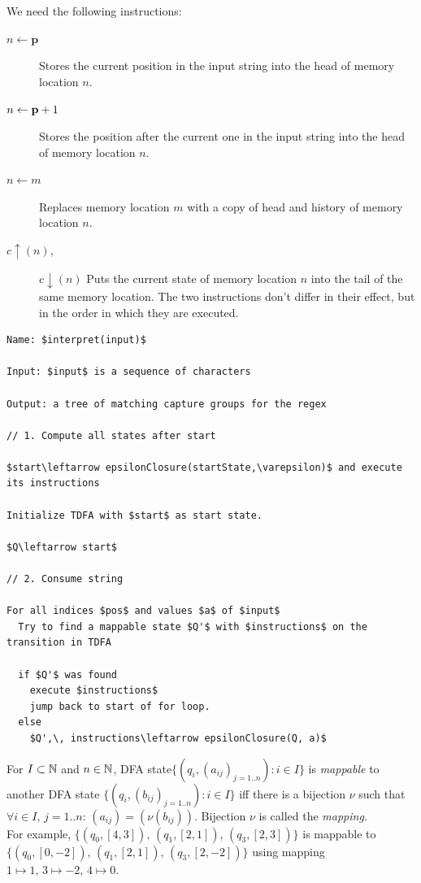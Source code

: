 \documentclass[english]{sigplanconf}
\begin{document}
We need the following instructions:
\begin{description}
\item [{$n\leftarrow\mathbf{p}$}] Stores the current position in the input
string into the head of memory location $n$.
\item [{$n\leftarrow\mathbf{\mathbf{p}}+1$}] Stores the position after the current one
in the input string into the head of memory location $n$.
\item [{$n\leftarrow m$}] Replaces memory location $m$ with a copy of
head and history of memory location $n$.
\item [{$c\uparrow(n)$,}] $c\downarrow(n)$ Puts the current state of
memory location $n$ into the tail of the same memory location. The
two instructions don't differ in their effect, but in the order in
which they are executed.
\end{description}
\begin{algorithm*}[tb]
\begin{lstlisting}[mathescape]
Name: $interpret(input)$

Input: $input$ is a sequence of characters

Output: a tree of matching capture groups for the regex

// 1. Compute all states after start

$start\leftarrow epsilonClosure(startState,\varepsilon)$ and execute its instructions

Initialize TDFA with $start$ as start state.

$Q\leftarrow start$

// 2. Consume string

For all indices $pos$ and values $a$ of $input$
  Try to find a mappable state $Q'$ with $instructions$ on the transition in TDFA

  if $Q'$ was found
    execute $instructions$
    jump back to start of for loop.
  else
    $Q',\, instructions\leftarrow epsilonClosure(Q, a)$
\end{lstlisting}
\end{algorithm*}

For $I\subset\mathbb{N}$ and $n\in\mathbb{N}$, DFA state$\{(q_{i},(a_{ij})_{j=1..n}):i\in I\}$
is \emph{mappable} to another DFA state $\{(q_{i},(b_{ij})_{j=1..n}):i\in I\}$
iff there is a bijection $\nu$ such that $\forall i\in I,\, j=1..n:\,(a_{ij})=(\nu(b_{ij}))$.
Bijection $\nu$ is called the \emph{mapping}.\\
For example, $\{(q_{0},[4,3]),\,(q_{1},[2,1]),\,(q_{3},[2,3])\}$
is mappable to $\{(q_{0},[0,-2]),\,(q_{1},[2,1]),\,(q_{3},[2,-2])\}$
using mapping $1\mapsto1,\,3\mapsto-2,\,4\mapsto0$.
\end{document}
